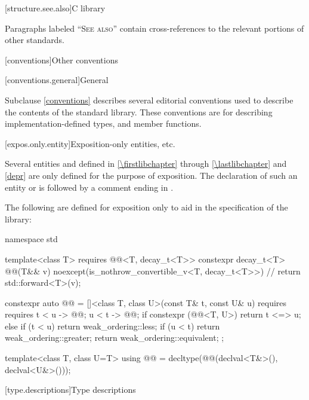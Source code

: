 [structure.see.also]{C library}

\pnum
Paragraphs labeled ``\textsc{See also}'' contain cross-references to the relevant portions
of other standards.

[conventions]{Other conventions}

[conventions.general]{General}
%

\pnum
Subclause \ref{conventions} describes several editorial conventions used to describe the contents
of the \Cpp{} standard library.
These conventions are for describing
implementation-defined types,
and member functions.

[expos.only.entity]{Exposition-only entities, etc.}

\pnum
Several entities and 
defined in \ref{\firstlibchapter} through \ref{\lastlibchapter} and \ref{depr}
are only defined for the purpose of exposition.
The declaration of such an entity or 
is followed by a comment ending in \expos.

\pnum
The following are defined for exposition only
to aid in the specification of the library:
%
\begin{codeblock}
namespace std {
  template<class T>
    requires @@<T, decay_t<T>>
      constexpr decay_t<T> @@(T&& v)
        noexcept(is_nothrow_convertible_v<T, decay_t<T>>)       // \expos
      { return std::forward<T>(v); }

  constexpr auto @@ =
    []<class T, class U>(const T& t, const U& u)
      requires requires {
        { t < u } -> @@;
        { u < t } -> @@;
      }
    {
      if constexpr (@@<T, U>) {
        return t <=> u;
      } else {
        if (t < u) return weak_ordering::less;
        if (u < t) return weak_ordering::greater;
        return weak_ordering::equivalent;
      }
    };

  template<class T, class U=T>
  using @@ = decltype(@@(declval<T&>(), declval<U&>()));
}
\end{codeblock}

[type.descriptions]{Type descriptions}

